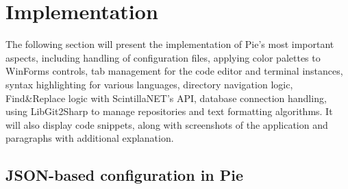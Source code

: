 \chapter{Implementation}
\thispagestyle{pagestyle}

The following section will present the implementation of Pie's most important aspects, including handling of configuration files, applying color palettes to WinForms controls, tab management for the code editor and terminal instances, syntax highlighting for various languages, directory navigation logic, Find\&Replace logic with ScintillaNET's API, database connection handling, using LibGit2Sharp to manage repositories and text formatting algorithms. It will also display code snippets, along with screenshots of the application and paragraphs with additional explanation.

\section{JSON-based configuration in Pie}
